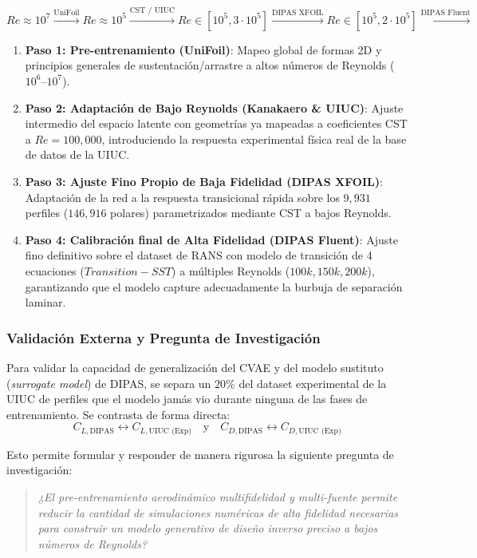 \begin{enumerate}
\begin{equation}
    Re \approx 10^7 \xrightarrow{\text{UniFoil}} Re \approx 10^5 \xrightarrow{\text{CST / UIUC}} Re \in [10^5, 3\cdot 10^5] \xrightarrow{\text{DIPAS XFOIL}} Re \in [10^5, 2\cdot 10^5] \xrightarrow{\text{DIPAS Fluent}}
\end{equation}

\begin{enumerate}
    \item \textbf{Paso 1: Pre-entrenamiento (UniFoil)}: Mapeo global de formas 2D y principios generales de sustentación/arrastre a altos números de Reynolds ($10^6\text{--}10^7$).
    \item \textbf{Paso 2: Adaptación de Bajo Reynolds (Kanakaero \& UIUC)}: Ajuste intermedio del espacio latente con geometrías ya mapeadas a coeficientes CST a $Re = 100{,}000$, introduciendo la respuesta experimental física real de la base de datos de la UIUC.
    \item \textbf{Paso 3: Ajuste Fino Propio de Baja Fidelidad (DIPAS XFOIL)}: Adaptación de la red a la respuesta transicional rápida sobre los $9{,}931$ perfiles ($146{,}916$ polares) parametrizados mediante CST a bajos Reynolds.
    \item \textbf{Paso 4: Calibración final de Alta Fidelidad (DIPAS Fluent)}: Ajuste fino definitivo sobre el dataset de RANS con modelo de transición de 4 ecuaciones ($Transition-SST$) a múltiples Reynolds ($100k, 150k, 200k$), garantizando que el modelo capture adecuadamente la burbuja de separación laminar.
\end{enumerate}

\subsubsection{Validación Externa y Pregunta de Investigación}
Para validar la capacidad de generalización del CVAE y del modelo sustituto (\textit{surrogate model}) de DIPAS, se separa un $20\%$ del dataset experimental de la UIUC de perfiles que el modelo jamás vio durante ninguna de las fases de entrenamiento. Se contrasta de forma directa:
\begin{equation}
    C_{L,\text{DIPAS}} \leftrightarrow C_{L,\text{UIUC (Exp)}} \quad \text{y} \quad C_{D,\text{DIPAS}} \leftrightarrow C_{D,\text{UIUC (Exp)}}
\end{equation}

Esto permite formular y responder de manera rigurosa la siguiente pregunta de investigación:
\begin{quote}
    \textit{¿El pre-entrenamiento aerodinámico multifidelidad y multi-fuente permite reducir la cantidad de simulaciones numéricas de alta fidelidad necesarias para construir un modelo generativo de diseño inverso preciso a bajos números de Reynolds?}
\end{quote}


\end{enumerate}
